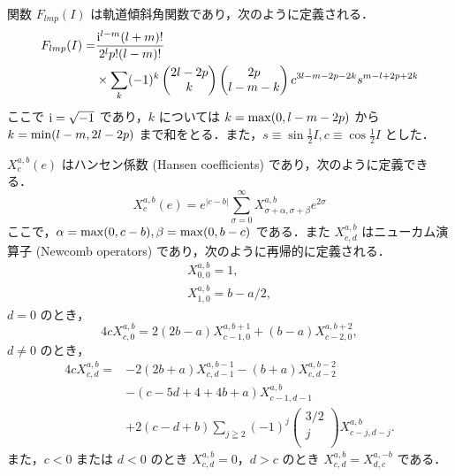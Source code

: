 \documentclass[11pt,a4paper,oneside,onecolumn]{jreport}
\begin{document}
関数 $F_{lmp} (I)$ は軌道傾斜角関数であり，次のように定義される．
\begin{equation}
\begin{split}
F_{lmp} (I) = & \frac{{\rm i}^{l - m} (l + m) !}{2^l p ! (l - m) !} \\
& \times \sum_k (-1)^k 
\begin{pmatrix}
2l - 2p \\
k \\
\end{pmatrix}
\begin{pmatrix}
2p \\
l - m - k \\
\end{pmatrix}
c^{3l - m - 2p - 2k} s^{m - l + 2p + 2k}
\end{split} \label{eq:F_lmp}
\end{equation}
ここで ${\rm i} = \sqrt{-1}$ であり，$k$ については $k = {\rm max} (0, l - m - 2p)$ から $k = {\rm min} (l - m, 2l - 2p)$ まで和をとる．また，$s \equiv \sin \frac{1}{2} I, c \equiv \cos \frac{1}{2} I$ とした．

$X_c^{a, b} (e)$ はハンセン係数 (Hansen coefficients) であり，次のように定義できる．
\begin{equation}
X_c^{a, b} (e) = e^{|c - b|} \sum_{\sigma = 0}^{\infty} X_{\sigma + \alpha, \sigma + \beta}^{a, b} e^{2 \sigma}
\end{equation}
ここで，$\alpha = {\rm max} (0, c - b), \beta = {\rm max} (0, b - c)$ である．また $X_{c, d}^{a, b}$ はニューカム演算子 (Newcomb operators) であり，次のように再帰的に定義される．
\begin{eqnarray}
X_{0, 0}^{a, b} = 1,\\
X_{1, 0}^{a, b} = b - a / 2,
\end{eqnarray}
$d = 0$ のとき，
\begin{equation}
4 c X_{c, 0}^{a, b} = 2 (2b - a) X_{c - 1, 0}^{a, b + 1} + (b - a) X_{c - 2, 0}^{a, b + 2},
\end{equation}
$d \not = 0$ のとき，
\begin{equation}
\begin{split}
4 c X_{c, d}^{a, b} = & -2 (2b + a) X_{c, d - 1}^{a, b - 1} - (b + a) X_{c, d - 2}^{a, b - 2} \\
& - (c - 5d + 4 + 4b +a) X_{c - 1, d - 1}^{a, b} \\
& + 2 (c - d + b) \sum_{j \geqq 2} (-1)^j
\begin{pmatrix}
3/2 \\
j \\
\end{pmatrix}
X_{c - j, d - j}^{a, b}.
\end{split} \label{eq:4dX}
\end{equation}
また，$c < 0$ または $d < 0$ のとき $X_{c, d}^{a, b} = 0$，$d > c$ のとき $X_{c, d}^{a, b} = X_{d, c}^{a, -b}$ である．
\end{document}
